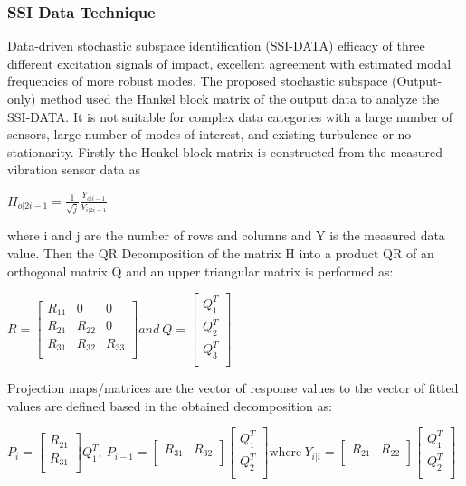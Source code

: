\documentclass{article}
\begin{document}
\subsubsection{SSI Data Technique}
Data-driven stochastic subspace identification (SSI-DATA) efficacy of three different excitation signals of impact, excellent agreement with estimated modal frequencies of more robust modes. The proposed stochastic subspace (Output-only) method used the Hankel block matrix of the output data to analyze the SSI-DATA. It is not suitable for complex data categories with a large number of sensors, large number of modes of interest, and existing turbulence or no-stationarity. Firstly the Henkel block matrix is constructed from the measured vibration sensor data as

\begin{center}
    $H_{o|2i-1} = \frac{1}{\sqrt{j}}\frac{Y_{o|i-1}}{Y_{i|2i-1}}$
\end{center}

where i and j are the number of rows and columns and Y is the measured data value. Then the QR Decomposition of the matrix H into a product QR of an orthogonal matrix Q and an upper triangular matrix is performed as:

\begin{center}
    $R =\begin{bmatrix}R_{11}&0&0\\R_{21}&R_{22}&0\\R_{31}&R_{32}&R_{33}\\\end{bmatrix} and\ Q = \begin{bmatrix}Q_1^T \\Q_2^T\\Q_3^T\\\end{bmatrix}$
\end{center}

Projection maps/matrices are the vector of response values to the vector of fitted values are defined based in the obtained decomposition as:

\begin{center}
    $P_i = \begin{bmatrix} R_{21}\\ R_{31}\\ \end{bmatrix}Q_1^T, \ P_{i-1} = \begin{bmatrix} R_{31}&R_{32}\\ \end{bmatrix} \begin{bmatrix} Q_1^T\\ Q_2^T\\ \end{bmatrix} \text{where} \ Y_{i|i} = \begin{bmatrix} R_{21}&R_{22} \\ \end{bmatrix} \begin{bmatrix} Q_1^T\\ Q_2^T\\ \end{bmatrix}$
\end{center}
\end{document}
